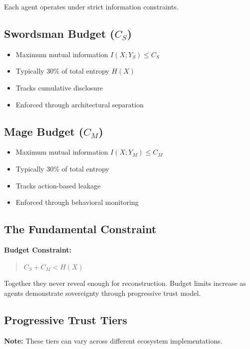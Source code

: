 \documentclass[11pt,a4paper]{article}
\theoremstyle{definition}
\begin{document}
Each agent operates under strict information constraints.

\subsection{Swordsman Budget ($C_S$)}

\begin{itemize}
    \item Maximum mutual information $I(X; Y_S) \leq C_S$
    \item Typically 30\% of total entropy $H(X)$
    \item Tracks cumulative disclosure
    \item Enforced through architectural separation
\end{itemize}

\subsection{Mage Budget ($C_M$)}

\begin{itemize}
    \item Maximum mutual information $I(X; Y_M) \leq C_M$
    \item Typically 30\% of total entropy
    \item Tracks action-based leakage
    \item Enforced through behavioral monitoring
\end{itemize}

\subsection{The Fundamental Constraint}

\textbf{Budget Constraint:}

\begin{quote}
\textbf{$C_S + C_M < H(X)$}
\end{quote}

Together they never reveal enough for reconstruction. Budget limits increase as agents demonstrate sovereignty through progressive trust model.

\subsection{Progressive Trust Tiers}

\textbf{Note:} These tiers can vary across different ecosystem implementations.
\end{document}
